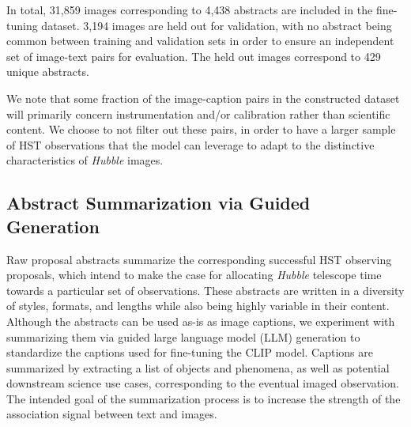 \documentclass{article} %
\newcommand{\hubble}{\emph{Hubble}\xspace}
\begin{document}
   In total, 31,859 images corresponding to 4,438 abstracts are included in the fine-tuning dataset.
   3,194 images are held out for validation, with no abstract being common between training and validation sets in order to ensure an independent set of image-text pairs for evaluation. The held out images correspond to 429 unique abstracts.  %
   
   We note that some fraction of the image-caption pairs in the constructed dataset will primarily concern instrumentation and/or calibration rather than scientific content.
   We choose to not filter out these pairs, in order to have a larger sample of HST observations that the model can leverage to adapt to the distinctive characteristics of \hubble images.
   
   \subsection{Abstract Summarization via Guided Generation}
   \label{sec:summarization}
   
   Raw proposal abstracts summarize the corresponding successful HST observing proposals, which intend to make the case for allocating \hubble telescope time towards a particular set of observations.
   These abstracts are written in a diversity of styles, formats, and lengths while also being highly variable in their content.
   Although the abstracts can be used as-is as image captions, we experiment with summarizing them via guided large language model (LLM) generation to standardize the captions used for fine-tuning the CLIP model.
   Captions are summarized by extracting a list of objects and phenomena, as well as potential downstream science use cases, corresponding to the eventual imaged observation.
   The intended goal of the summarization process is to increase the strength of the association signal between text and images.
   
\end{document}

